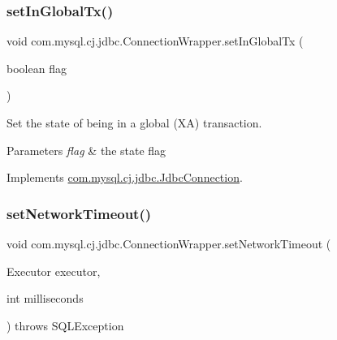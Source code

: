 \subsubsection{\texorpdfstring{set\+In\+Global\+Tx()}{setInGlobalTx()}}
{\footnotesize\ttfamily void com.\+mysql.\+cj.\+jdbc.\+Connection\+Wrapper.\+set\+In\+Global\+Tx (\begin{DoxyParamCaption}\item[{boolean}]{flag }\end{DoxyParamCaption})}

Set the state of being in a global (XA) transaction.


\begin{DoxyParams}{Parameters}
{\em flag} & the state flag \\
\hline
\end{DoxyParams}


Implements \mbox{\hyperlink{interfacecom_1_1mysql_1_1cj_1_1jdbc_1_1_jdbc_connection_af7cff3ba67d2b787b04c3eff40f9e087}{com.\+mysql.\+cj.\+jdbc.\+Jdbc\+Connection}}.

\mbox{\label{classcom_1_1mysql_1_1cj_1_1jdbc_1_1_connection_wrapper_a23b7f1ca38d2fdea8de3a7f0e971233d}} 
\subsubsection{\texorpdfstring{set\+Network\+Timeout()}{setNetworkTimeout()}}
{\footnotesize\ttfamily void com.\+mysql.\+cj.\+jdbc.\+Connection\+Wrapper.\+set\+Network\+Timeout (\begin{DoxyParamCaption}\item[{Executor}]{executor,  }\item[{int}]{milliseconds }\end{DoxyParamCaption}) throws S\+Q\+L\+Exception}

\mbox{\label{classcom_1_1mysql_1_1cj_1_1jdbc_1_1_connection_wrapper_a2b781b548795804db1bd1d82d1b381fb}} 
